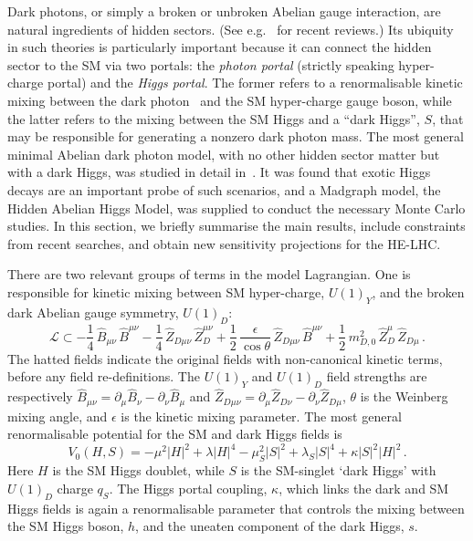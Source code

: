 \label{Sec:4lExo}

Dark photons, or simply a broken or unbroken Abelian gauge interaction, are natural ingredients of hidden sectors. (See e.g.~\cite{Jaeckel:2010ni,Hewett:2012ns,Essig:2013lka,Alexander:2016aln,Battaglieri:2017aum} for recent reviews.) Its ubiquity in such theories is particularly important because it can connect the hidden sector to the SM via two portals: the \emph{photon portal} (strictly speaking hyper-charge portal) and the \emph{Higgs portal}. The former refers to a renormalisable kinetic mixing between the dark photon~\cite{Holdom:1985ag,Galison:1983pa,Dienes:1996zr} and the SM hyper-charge gauge boson, while the latter refers to the mixing between the SM Higgs and a ``dark Higgs'', $S$, that may be responsible for generating a nonzero dark photon mass. 
%
The most general minimal Abelian dark photon model, with no other hidden sector matter but with a dark Higgs, was studied in detail in~\cite{Curtin:2014cca}. It was found that exotic Higgs decays are an important probe of such scenarios, and a Madgraph \cite{Alwall:2011uj} model, the Hidden Abelian Higgs Model, was supplied to conduct the necessary Monte Carlo studies. In this section, we briefly summarise the main results, include constraints from recent searches, and obtain new sensitivity projections for the HE-LHC. 


There are two relevant groups of terms in the model Lagrangian. One is responsible for kinetic mixing between SM hyper-charge, $U(1)_Y$, and the broken dark Abelian gauge symmetry, $U(1)_D$:
%
\begin{equation}\label{eq:KM}
\mathcal{L} \subset -\frac{1}{4} \,\hat B_{\mu\nu}\, \hat B^{\mu\nu} - \frac{1}{4} \,\hat Z_{D\mu\nu}\, \hat Z_D^{\mu\nu}  + \frac{1}{2}\,\frac{\epsilon}{\cos\theta} \,\hat Z_ {D\mu\nu}\,\hat B^{\mu\nu} + \frac{1}{2}\, m_{D,0}^2\, \hat Z_D^\mu \, \hat Z_{D\mu}\, .
\end{equation}
%
The hatted fields indicate the original fields with non-canonical
kinetic terms, before any field re-definitions. 
%
The $U(1)_Y$ and
$U(1)_D$ field strengths are respectively $\hat B_{\mu\nu}
=\partial_\mu \hat B_{\nu} - \partial_\nu \hat B_{\mu}$ and $\hat
Z_{D\mu\nu} =\partial_\mu \hat Z_{D\nu} - \partial_\nu \hat Z_{D\mu}$,
$\theta$ is the Weinberg mixing angle, and $\epsilon$ is the kinetic
mixing parameter.
The most general renormalisable potential for the SM and dark Higgs fields is 
\begin{equation}
\label{eq:HM}
V_0 (H,S) =   -\mu^2|H|^2 +  \lambda |H|^4 -\mu_S^2 |S|^2 + \lambda_S |S|^4 +
   \kappa  |S|^2|H|^2\, .
\end{equation}
Here $H$ is the SM Higgs doublet, while $S$ is the SM-singlet `dark
Higgs' with $U(1)_D$ charge $q_S$.  The Higgs portal coupling, $\kappa$, which links the dark and SM Higgs fields is again a renormalisable parameter that controls the mixing between the SM Higgs boson, $h$, and the uneaten component of the dark Higgs, $s$. 





